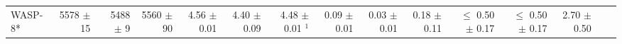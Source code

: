 \begin{sidewaystable*}[t!]
{\begin{tabular}{l r r r r r r r r r r r r r r}
 
WASP-8* 
&  5578  $\pm$ 15 
& 5488  $\pm$ 9 
&  5560 $\pm$ 90 
&   4.56  $\pm$ 0.01  
&  4.40  $\pm$ 0.09 
& 4.48  $\pm$ 0.01 $^1$
&  0.09  $\pm$ 0.01
& 0.03  $\pm$ 0.01
&  0.18   $\pm$ 0.11
&  $\leq$ 0.50  $\pm$ 0.17 
& $\leq$ 0.50  $\pm$ 0.17
&  2.70   $\pm$ 0.50  \\



\end{tabular}}
\end{sidewaystable*}

